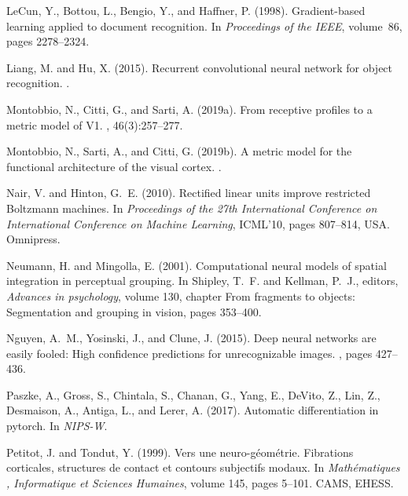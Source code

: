 \documentclass[11pt,oneside,reqno]{amsart}
\begin{document}
\begin{thebibliography}{}
LeCun, Y., Bottou, L., Bengio, Y., and Haffner, P. (1998).
\newblock Gradient-based learning applied to document recognition.
\newblock In {\em Proceedings of the IEEE}, volume~86, pages 2278--2324.

Liang, M. and Hu, X. (2015).
\newblock Recurrent convolutional neural network for object recognition.
.

Montobbio, N., Citti, G., and Sarti, A. (2019a).
\newblock From receptive profiles to a metric model of {V}1.
, 46(3):257--277.

Montobbio, N., Sarti, A., and Citti, G. (2019b).
\newblock A metric model for the functional architecture of the visual cortex.
.

Nair, V. and Hinton, G.~E. (2010).
\newblock Rectified linear units improve restricted {B}oltzmann machines.
\newblock In {\em Proceedings of the 27th International Conference on
  International Conference on Machine Learning}, ICML'10, pages 807--814, USA.
  Omnipress.

Neumann, H. and Mingolla, E. (2001).
\newblock Computational neural models of spatial integration in perceptual
  grouping.
\newblock In Shipley, T.~F. and Kellman, P.~J., editors, {\em Advances in
  psychology}, volume 130, chapter From fragments to objects: Segmentation and
  grouping in vision, pages 353--400.

Nguyen, A.~M., Yosinski, J., and Clune, J. (2015).
\newblock Deep neural networks are easily fooled: High confidence predictions
  for unrecognizable images.
, pages 427--436.

Paszke, A., Gross, S., Chintala, S., Chanan, G., Yang, E., DeVito, Z., Lin, Z.,
  Desmaison, A., Antiga, L., and Lerer, A. (2017).
\newblock Automatic differentiation in pytorch.
\newblock In {\em NIPS-W}.

Petitot, J. and Tondut, Y. (1999).
\newblock Vers une neuro-g\'{e}om\'{e}trie. {F}ibrations corticales, structures
  de contact et contours subjectifs modaux.
\newblock In {\em Math\'{e}matiques , Informatique et Sciences Humaines},
  volume 145, pages 5--101. CAMS, EHESS.


\end{thebibliography}
\end{document}
